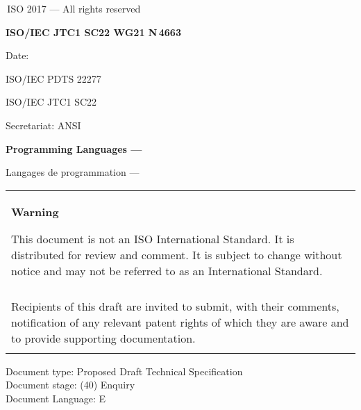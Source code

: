 

\thispagestyle{empty}
{\raisebox{.35ex}{\smaller\copyright}}\,ISO 2017 --- All rights reserved
\vspace{2ex}

\begin{flushright}
	\textbf{ISO/IEC JTC1 SC22 WG21 N\,\LARGE4663}
	
	Date: \reldate
	
	ISO/IEC PDTS 22277
	
	ISO/IEC JTC1 SC22
	
	Secretariat: ANSI
	
\end{flushright}

\vfill

\textbf{\LARGE Programming Languages --- \doctitle}

Langages de programmation --- \frtitle

\vfill

\begin{tabular}{|p{\hsize}|}
	\hline
	\begin{center}
		\textbf{Warning}
	\end{center}
	
	\vspace{2ex}
	
	This document is not an ISO International Standard. It is distributed
	for review and comment. It is subject to change without notice and may
	not be referred to as an International Standard.\\\\
	
	Recipients of this draft are invited to submit, with their comments,
	notification of any relevant patent rights of which they are aware
	and to provide supporting documentation.\\\\
	\hline
\end{tabular}

\vfill
\noindent
Document type: Proposed Draft Technical Specification\\
Document stage: (40) Enquiry\\
Document Language: E
\pagebreak

\thispagestyle{cpppage}


